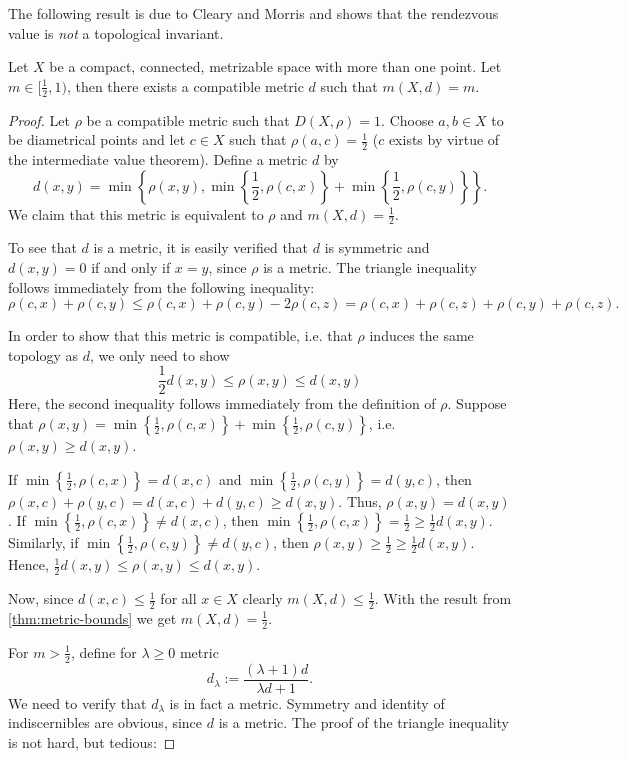 The following result is due to Cleary and Morris \cite{cleary-morris} and shows that the rendezvous value is \emph{not} a topological invariant.

\begin{theorem}
	Let $X$ be a compact, connected, metrizable space with more than one point. Let $m\in [\frac{1}{2},1)$, then there exists a compatible metric $d$ such that $m(X,d)=m$.
\end{theorem}

\begin{proof}
	Let $\rho$ be a compatible metric such that $D(X,\rho)=1$. Choose $a,b\in X$ to be diametrical points and let $c\in X$ such that $\rho(a,c)=\frac{1}{2}$ ($c$ exists by virtue of the intermediate value theorem). Define a metric $d$ by
	\[
	d(x,y)=\min\left\{\rho(x,y),\min\left\{\frac{1}{2},\rho(c,x)\right\}+\min\left\{\frac{1}{2},\rho(c,y)\right\}\right\}.
	\] 
	We claim that this metric is equivalent to $\rho$ and $m(X,d)=\frac{1}{2}$. 
	
	To see that $d$ is a metric, it is easily verified that $d$ is symmetric and $d(x,y)=0$ if and only if $x=y$, since $\rho$ is a metric. The triangle inequality follows immediately from the following inequality:
	\[
	\rho(c,x)+\rho(c,y)\leq \rho(c,x)+\rho(c,y)-2\rho(c,z)=\rho(c,x)+\rho(c,z)+\rho(c,y)+\rho(c,z).
	\]
	
	In order to show that this metric is compatible, i.e. that $\rho$ induces the same topology as $d$, we only need to show
	\[
	\frac{1}{2}d(x,y)\leq\rho(x,y)\leq d(x,y)
	\]
	Here, the second inequality follows immediately from the definition of $\rho$.
	Suppose that $\rho(x,y)=\min\left\{\frac{1}{2},\rho(c,x)\right\}+\min\left\{\frac{1}{2},\rho(c,y)\right\}$, i.e. $\rho(x,y)\geq d(x,y)$.
	
	If $\min\left\{\frac{1}{2},\rho(c,x)\right\}=d(x,c)$ and $\min\left\{\frac{1}{2},\rho(c,y)\right\}=d(y,c)$, then $\rho(x,c)+\rho(y,c)=d(x,c)+d(y,c)\geq d(x,y)$. Thus, $\rho(x,y)=d(x,y)$. If $\min\left\{\frac{1}{2},\rho(c,x)\right\}\neq d(x,c)$, then $\min\left\{\frac{1}{2},\rho(c,x)\right\}=\frac{1}{2}\geq \frac{1}{2}d(x,y)$. Similarly, if $\min\left\{\frac{1}{2},\rho(c,y)\right\}\neq d(y,c)$, then $\rho(x,y)\geq \frac{1}{2}\geq \frac{1}{2}d(x,y)$. Hence, $\frac{1}{2}d(x,y)\leq \rho(x,y)\leq d(x,y)$.

	Now, since $d(x,c)\leq \frac{1}{2}$ for all $x\in X$ clearly $m(X,d)\leq \frac{1}{2}$. With the result from \autoref{thm:metric-bounds} we get $m(X,d)=\frac{1}{2}$.

		
	For $m>\frac{1}{2}$, define for $\lambda\geq 0$ metric
	\[
	d_\lambda:=\frac{(\lambda+1)d}{\lambda d+1}.
	\]
	We need to verify that $d_\lambda$ is in  fact a metric. Symmetry and identity of indiscernibles are obvious, since $d$ is a metric. The proof of the triangle inequality is not hard, but tedious:
	

\end{proof}
